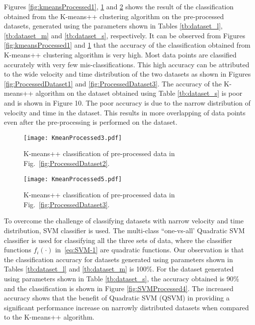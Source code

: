 \documentclass[letterpaper, 10 pt, conference]{ieeeconf}
\begin{document}
Figures \ref{fig:kmeansProcessed1}, \ref{fig:kmeansProcessed3} and \ref{fig:kmeansProcessed4} shows the result of the classification obtained from the K-means++ clustering algorithm on the pre-processed datasets, generated using the parameters shown in Tables \ref{tb:dataset_l}, \ref{tb:dataset_m} and \ref{tb:dataset_s}, respectively. It can be observed from Figures \ref{fig:kmeansProcessed1} and \ref{fig:kmeansProcessed3} that the accuracy of the classification obtained from K-means++ clustering algorithm is very high. Most data points are classified accurately with very few mis-classifications. This high accuracy can be attributed to the wide velocity and time distribution of the two datasets as shown in Figures \ref{fig:ProcessedDataset1} and \ref{fig:ProcessedDataset3}. The accuracy of the K-means++ algorithm on the dataset obtained using Table \ref{tb:dataset_s} is poor and is shown in Figure 10. The poor accuracy is due to the narrow distribution of velocity and time in the dataset. This results in more overlapping of data points even after the pre-processing is performed on the dataset. 

\begin{figure}[h!]
\centering
\captionsetup{justification=centering}
\texttt{[image: KmeanProcessed3.pdf]}
\caption{K-means++ classification of pre-processed data in Fig.~\ref{fig:ProcessedDataset2}.}
\label{fig:kmeansProcessed3}
\end{figure}
\begin{figure}[h!]
\centering
\captionsetup{justification=centering}
\texttt{[image: KmeanProcessed5.pdf]}
\caption{K-means++ classification of pre-processed data in Fig.~\ref{fig:ProcessedDataset3}.}
\label{fig:kmeansProcessed4}
\end{figure}

To overcome the challenge of classifying datasets with narrow velocity and time distribution, SVM classifier is used. The multi-class ``one-vs-all'  Quadratic SVM classifier is used for classifying all the three sets of data, where the classifier functions $f_i(\cdot)$ in~\eqref{eq:SVM-1} are quadratic functions. Our observation is that the classification accuracy for datasets generated using parameters shown in Tables \ref{tb:dataset_l} and \ref{tb:dataset_m} is 100\%. For the dataset generated using parameters shown in Table \ref{tb:dataset_s}, the accuracy obtained is 90\% and the classification is shown in Figure \ref{fig:SVMProcessed4}. The increased accuracy shows that the benefit of Quadratic SVM (QSVM) in providing a  significant performance increase on narrowly distributed datasets when compared to the K-means++ algorithm.
\end{document}
